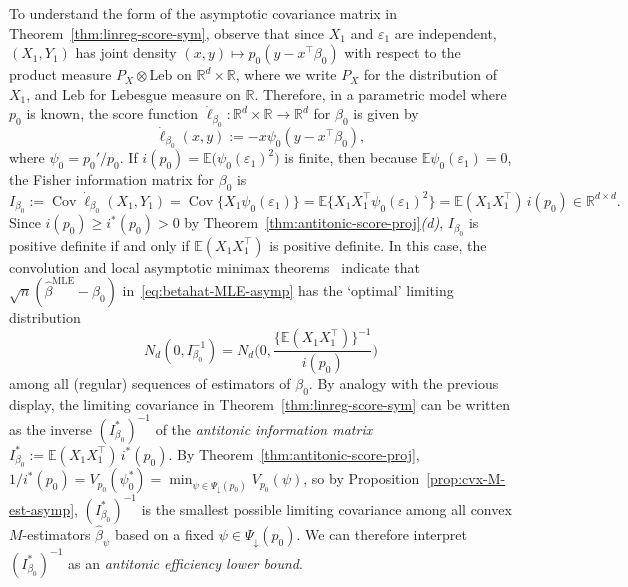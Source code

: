 \documentclass[a4paper]{article}
\newcommand{\R}{\mathbb{R}}
\newcommand{\E}{\mathbb{E}}
\DeclareMathOperator\Cov{Cov}
\theoremstyle{definition}
\begin{document}
To understand the form of the asymptotic covariance matrix in Theorem~\ref{thm:linreg-score-sym}, observe that since $X_1$ and $\varepsilon_1$ are independent, $(X_1,Y_1)$ has joint density $(x,y) \mapsto p_0(y - x^\top\beta_0)$ with respect to the product measure $P_X \otimes \mathrm{Leb}$ on $\R^d \times \R$, where we write $P_X$ for the distribution of $X_1$, and $\mathrm{Leb}$ for Lebesgue measure on $\R$. Therefore, in a parametric model where $p_0$ is known, the score function $\dot{\ell}_{\beta_0} \colon \R^d \times \R \to \R^d$ for $\beta_0$ is given by
\[
\dot{\ell}_{\beta_0}(x,y) := -x\psi_0(y - x^\top\beta_0),
\]
where $\psi_0 = p_0'/p_0$. If $i(p_0) = \E\bigl(\psi_0(\varepsilon_1)^2\bigr)$ is finite, then because $\E\psi_0(\varepsilon_1) = 0$, the Fisher information matrix for $\beta_0$ is
\begin{equation}
\label{eq:Ibeta0}
I_{\beta_0} := \Cov\dot{\ell}_{\beta_0}(X_1,Y_1) = \Cov\{X_1\psi_0(\varepsilon_1)\} = \E\bigl\{X_1 X_1^\top\psi_0(\varepsilon_1)^2\bigr\} = \E(X_1 X_1^\top)\,i(p_0) \in \R^{d \times d}.
\end{equation}
Since $i(p_0) \geq i^*(p_0) > 0$ by Theorem~\ref{thm:antitonic-score-proj}\textit{(d)}, $I_{\beta_0}$ is positive definite if and only if $\E(X_1 X_1^\top)$ is positive definite. In this case, the convolution and local asymptotic minimax theorems~\citep[Chapter~8]{vdV1998asymptotic} indicate that $\sqrt{n}(\hat{\beta}^{\mathrm{MLE}} - \beta_0)$ in~\eqref{eq:betahat-MLE-asymp} has the `optimal' limiting distribution
\[
N_d(0, I_{\beta_0}^{-1}) = N_d\biggl(0, \frac{\{\E(X_1 X_1^\top)\}^{-1}}{i(p_0)}\biggr)
\]
among all (regular) sequences of estimators of $\beta_0$. By analogy with the previous display, the limiting covariance in Theorem~\ref{thm:linreg-score-sym} can be written as the inverse $(I^*_{\beta_0})^{-1}$ of the \textit{antitonic information matrix} $I^*_{\beta_0} := \E(X_1 X_1^\top)\,i^*(p_0)$. By Theorem~\ref{thm:antitonic-score-proj}, $1/i^*(p_0) = V_{p_0}(\psi_0^*) = \min_{\psi \in \Psi_\downarrow(p_0)}V_{p_0}(\psi)$, so by Proposition~\ref{prop:cvx-M-est-asymp}, $(I^*_{\beta_0})^{-1}$ is the smallest possible limiting covariance among all convex $M$-estimators $\hat{\beta}_\psi$ based on a fixed $\psi \in \Psi_\downarrow(p_0)$. We can therefore interpret $(I^*_{\beta_0})^{-1}$ as an \textit{antitonic efficiency lower bound}.
\end{document}
